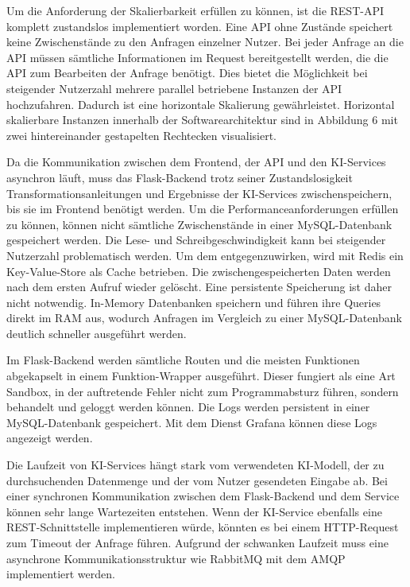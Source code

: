 Um die Anforderung der Skalierbarkeit erfüllen zu können, ist die REST-API komplett zustandslos implementiert worden. Eine API ohne Zustände speichert keine Zwischenstände zu den Anfragen einzelner Nutzer. Bei jeder Anfrage an die API müssen sämtliche Informationen im Request bereitgestellt werden, die die API zum Bearbeiten der Anfrage benötigt. Dies bietet die Möglichkeit bei steigender Nutzerzahl mehrere parallel betriebene Instanzen der API hochzufahren. Dadurch ist eine horizontale Skalierung gewährleistet. Horizontal skalierbare Instanzen innerhalb der Softwarearchitektur sind in Abbildung 6 mit zwei hintereinander gestapelten Rechtecken visualisiert.

Da die Kommunikation zwischen dem Frontend, der API und den KI-Services asynchron läuft, muss das Flask-Backend trotz seiner Zustandslosigkeit Transformationsanleitungen und Ergebnisse der KI-Services zwischenspeichern, bis sie im Frontend benötigt werden. Um die Performanceanforderungen erfüllen zu können, können nicht sämtliche Zwischenstände in einer MySQL-Datenbank gespeichert werden. Die Lese- und Schreibgeschwindigkeit kann bei steigender Nutzerzahl problematisch werden. Um dem entgegenzuwirken, wird mit Redis ein Key-Value-Store als Cache betrieben. Die zwischengespeicherten Daten werden nach dem ersten Aufruf wieder gelöscht. Eine persistente Speicherung ist daher nicht notwendig. In-Memory Datenbanken speichern und führen ihre Queries direkt im RAM aus, wodurch Anfragen im Vergleich zu einer MySQL-Datenbank deutlich schneller ausgeführt werden.

Im Flask-Backend werden sämtliche Routen und die meisten Funktionen abgekapselt in einem Funktion-Wrapper ausgeführt. Dieser fungiert als eine Art Sandbox, in der auftretende Fehler nicht zum Programmabsturz führen, sondern behandelt und geloggt werden können. Die Logs werden persistent in einer MySQL-Datenbank gespeichert. Mit dem Dienst Grafana können diese Logs angezeigt werden.

Die Laufzeit von KI-Services hängt stark vom verwendeten KI-Modell, der zu durchsuchenden Datenmenge und der vom Nutzer gesendeten Eingabe ab. Bei einer synchronen Kommunikation zwischen dem Flask-Backend und dem Service können sehr lange Wartezeiten entstehen. Wenn der KI-Service ebenfalls eine REST-Schnittstelle implementieren würde, könnten es bei einem HTTP-Request zum Timeout der Anfrage führen. Aufgrund der schwanken Laufzeit muss eine asynchrone Kommunikationsstruktur wie RabbitMQ mit dem AMQP implementiert werden.

